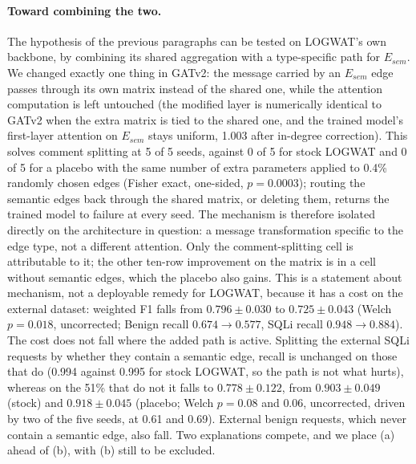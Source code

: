\paragraph{Toward combining the two.}
The hypothesis of the previous paragraphs can be tested on LOGWAT's own backbone, by combining its shared aggregation with a type-specific path for $E_{sem}$. We changed exactly one thing in GATv2: the message carried by an $E_{sem}$ edge passes through its own matrix instead of the shared one, while the attention computation is left untouched (the modified layer is numerically identical to GATv2 when the extra matrix is tied to the shared one, and the trained model's first-layer attention on $E_{sem}$ stays uniform, 1.003 after in-degree correction). This solves comment splitting at 5 of 5 seeds, against 0 of 5 for stock LOGWAT and 0 of 5 for a placebo with the same number of extra parameters applied to 0.4\% randomly chosen edges (Fisher exact, one-sided, $p=0.0003$); routing the semantic edges back through the shared matrix, or deleting them, returns the trained model to failure at every seed. The mechanism is therefore isolated directly on the architecture in question: a message transformation specific to the edge type, not a different attention. Only the comment-splitting cell is attributable to it; the other ten-row improvement on the matrix is in a cell without semantic edges, which the placebo also gains. This is a statement about mechanism, not a deployable remedy for LOGWAT, because it has a cost on the external dataset: weighted F1 falls from $0.796 \pm 0.030$ to $0.725 \pm 0.043$ (Welch $p=0.018$, uncorrected; Benign recall $0.674 \rightarrow 0.577$, SQLi recall $0.948 \rightarrow 0.884$). The cost does not fall where the added path is active. Splitting the external SQLi requests by whether they contain a semantic edge, recall is unchanged on those that do (0.994 against 0.995 for stock LOGWAT, so the path is not what hurts), whereas on the 51\% that do not it falls to $0.778 \pm 0.122$, from $0.903 \pm 0.049$ (stock) and $0.918 \pm 0.045$ (placebo; Welch $p=0.08$ and $0.06$, uncorrected, driven by two of the five seeds, at 0.61 and 0.69). External benign requests, which never contain a semantic edge, also fall. Two explanations compete, and we place (a) ahead of (b), with (b) still to be excluded.

